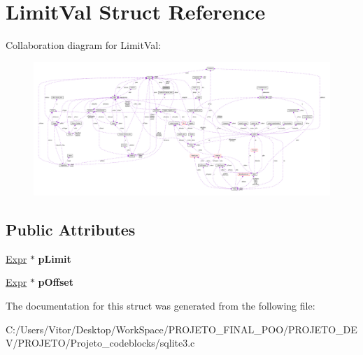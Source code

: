 \hypertarget{struct_limit_val}{\section{Limit\-Val Struct Reference}
\label{struct_limit_val}
}


Collaboration diagram for Limit\-Val\-:\nopagebreak
\begin{figure}[H]
\begin{center}
\leavevmode
\includegraphics[width=350pt]{struct_limit_val__coll__graph}
\end{center}
\end{figure}
\subsection*{Public Attributes}
\begin{DoxyCompactItemize}
\item 
\hypertarget{struct_limit_val_a96094d1b395a3f455263ff5907d72ed6}{\hyperlink{struct_expr}{Expr} $\ast$ {\bfseries p\-Limit}}\label{struct_limit_val_a96094d1b395a3f455263ff5907d72ed6}

\item 
\hypertarget{struct_limit_val_a43dedf453a8e5cb8091fcde524a7c736}{\hyperlink{struct_expr}{Expr} $\ast$ {\bfseries p\-Offset}}\label{struct_limit_val_a43dedf453a8e5cb8091fcde524a7c736}

\end{DoxyCompactItemize}


The documentation for this struct was generated from the following file\-:\begin{DoxyCompactItemize}
\item 
C\-:/\-Users/\-Vitor/\-Desktop/\-Work\-Space/\-P\-R\-O\-J\-E\-T\-O\-\_\-\-F\-I\-N\-A\-L\-\_\-\-P\-O\-O/\-P\-R\-O\-J\-E\-T\-O\-\_\-\-D\-E\-V/\-P\-R\-O\-J\-E\-T\-O/\-Projeto\-\_\-codeblocks/sqlite3.\-c\end{DoxyCompactItemize}
